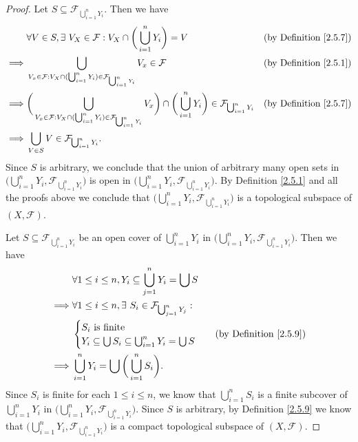 \begin{proof}
    Let \(S \subseteq \mathcal{F}_{\bigcup_{i = 1}^n Y_i}\).
    Then we have
    \begin{align*}
                 & \forall V \in S, \exists\ V_X \in \mathcal{F} : V_X \cap \bigg(\bigcup_{i = 1}^n Y_i\bigg) = V                                                                                                          & \text{(by Definition \ref{2.5.7})} \\
        \implies & \bigcup_{V_x \in \mathcal{F} : V_X \cap (\bigcup_{i = 1}^n Y_i) \in \mathcal{F}_{\bigcup_{i = 1}^n Y_i}} V_x \in \mathcal{F}                                                                            & \text{(by Definition \ref{2.5.1})} \\
        \implies & \bigg(\bigcup_{V_x \in \mathcal{F} : V_X \cap (\bigcup_{i = 1}^n Y_i) \in \mathcal{F}_{\bigcup_{i = 1}^n Y_i}} V_x\bigg) \cap \bigg(\bigcup_{i = 1}^n Y_i\bigg) \in \mathcal{F}_{\bigcup_{i = 1}^n Y_i} & \text{(by Definition \ref{2.5.7})} \\
        \implies & \bigcup_{V \in S} V \in \mathcal{F}_{\bigcup_{i = 1}^n Y_i}.
    \end{align*}
    Since \(S\) is arbitrary, we conclude that the union of arbitrary many open sets in \(\big(\bigcup_{i = 1}^n Y_i, \mathcal{F}_{\bigcup_{i = 1}^n Y_i}\big)\) is open in \(\big(\bigcup_{i = 1}^n Y_i, \mathcal{F}_{\bigcup_{i = 1}^n Y_i}\big)\).
    By Definition \ref{2.5.1} and all the proofs above we conclude that \(\big(\bigcup_{i = 1}^n Y_i, \mathcal{F}_{\bigcup_{i = 1}^n Y_i}\big)\) is a topological subspace of \((X, \mathcal{F})\).

    Let \(S \subseteq \mathcal{F}_{\bigcup_{i = 1}^n Y_i}\) be an open cover of \(\bigcup_{i = 1}^n Y_i\) in \(\big(\bigcup_{i = 1}^n Y_i, \mathcal{F}_{\bigcup_{i = 1}^n Y_i}\big)\).
    Then we have
    \begin{align*}
                 & \forall 1 \leq i \leq n, Y_i \subseteq \bigcup_{j = 1}^n Y_i = \bigcup S        \\
        \implies & \forall 1 \leq i \leq n, \exists\ S_i \in \mathcal{F}_{\bigcup_{j = 1}^n Y_j} : \\
                 & \begin{cases}
                       S_i \text{ is finite} \\
                       Y_i \subseteq \bigcup S_i \subseteq \bigcup_{i = 1}^n Y_i = \bigcup S
                   \end{cases}           & \text{(by Definition \ref{2.5.9})}            \\
        \implies & \bigcup_{i = 1}^n Y_i = \bigcup \bigg(\bigcup_{i = 1}^n S_i\bigg).
    \end{align*}
    Since \(S_i\) is finite for each \(1 \leq i \leq n\), we know that \(\bigcup_{i = 1}^n S_i\) is a finite subcover of \(\bigcup_{i = 1}^n Y_i\) in \(\big(\bigcup_{i = 1}^n Y_i, \mathcal{F}_{\bigcup_{i = 1}^n Y_i}\big)\).
    Since \(S\) is arbitrary, by Definition \ref{2.5.9} we know that \(\big(\bigcup_{i = 1}^n Y_i, \mathcal{F}_{\bigcup_{i = 1}^n Y_i}\big)\) is a compact topological subspace of \((X, \mathcal{F})\).


\end{proof}
